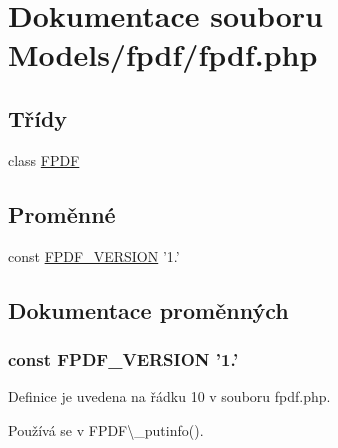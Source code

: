 \hypertarget{fpdf_8php}{\section{Dokumentace souboru Models/fpdf/fpdf.php}
\label{fpdf_8php}
}
\subsection*{Třídy}
\begin{DoxyCompactItemize}
\item 
class \hyperlink{class_f_p_d_f}{F\-P\-D\-F}
\end{DoxyCompactItemize}
\subsection*{Proměnné}
\begin{DoxyCompactItemize}
\item 
const \hyperlink{fpdf_8php_a77fb399caf1a81d2cdf17e98d954b512}{F\-P\-D\-F\-\_\-\-V\-E\-R\-S\-I\-O\-N} '1.'
\end{DoxyCompactItemize}


\subsection{Dokumentace proměnných}
\hypertarget{fpdf_8php_a77fb399caf1a81d2cdf17e98d954b512}{
\subsubsection[{F\-P\-D\-F\-\_\-\-V\-E\-R\-S\-I\-O\-N}]{\setlength{\rightskip}{0pt plus 5cm}const F\-P\-D\-F\-\_\-\-V\-E\-R\-S\-I\-O\-N '1.'}}\label{fpdf_8php_a77fb399caf1a81d2cdf17e98d954b512}


Definice je uvedena na řádku 10 v souboru fpdf.\-php.



Používá se v F\-P\-D\-F\textbackslash{}\-\_\-putinfo().

